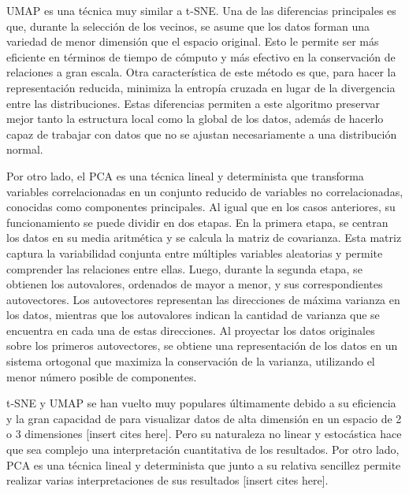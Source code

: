 UMAP es una técnica muy similar a t-SNE. Una de las diferencias principales es que, durante la selección de los vecinos, se asume que los datos forman una variedad de menor dimensión que el espacio original. Esto le permite ser más eficiente en términos de tiempo de cómputo y más efectivo en la conservación de relaciones a gran escala. Otra característica de este método es que, para hacer la representación reducida, minimiza la entropía cruzada en lugar de la divergencia entre las distribuciones. Estas diferencias permiten a este algoritmo preservar mejor tanto la estructura local como la global de los datos, además de hacerlo capaz de trabajar con datos que no se ajustan necesariamente a una distribución normal. 

Por otro lado, el PCA es una técnica lineal y determinista que transforma variables correlacionadas en un conjunto reducido de variables no correlacionadas, conocidas como componentes principales. Al igual que en los casos anteriores, su funcionamiento se puede dividir en dos etapas. En la primera etapa, se centran los datos en su media aritmética y se calcula la matriz de covarianza. Esta matriz captura la variabilidad conjunta entre múltiples variables aleatorias y permite comprender las relaciones entre ellas. Luego, durante la segunda etapa, se obtienen los autovalores, ordenados de mayor a menor, y sus correspondientes autovectores. Los autovectores representan las direcciones de máxima varianza en los datos, mientras que los autovalores indican la cantidad de varianza que se encuentra en cada una de estas direcciones. Al proyectar los datos originales sobre los primeros autovectores, se obtiene una representación de los datos en un sistema ortogonal que maximiza la conservación de la varianza, utilizando el menor número posible de componentes.

t-SNE y UMAP se han vuelto muy populares últimamente debido a su eficiencia y la gran capacidad de para visualizar datos de alta dimensión en un espacio de 2 o 3 dimensiones \alert{[insert cites here]}. Pero su naturaleza no linear y estocástica hace que sea complejo una interpretación cuantitativa de los resultados. Por otro lado, PCA es una técnica lineal y determinista que junto a su relativa sencillez permite realizar varias interpretaciones de sus resultados \alert{[insert cites here]}.

